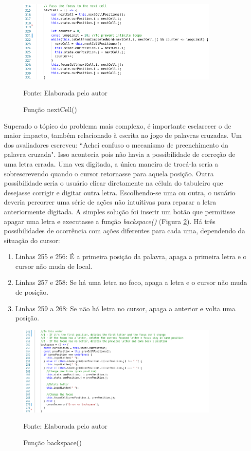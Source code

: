 \begin{figure}[H]
\centering
    \caption{Função nextCell()}
    \label{fig:nextcell}
    \includegraphics[width=0.9\textwidth]{Figuras/codeNextCell.png}
    
    Fonte: Elaborada pelo autor
\end{figure}



Superado o tópico do problema mais complexo, é importante esclarecer o de maior impacto, também relacionado à escrita no jogo de palavras cruzadas.
Um dos avaliadores escreveu: ``Achei confuso o mecanismo de preenchimento da palavra cruzada". Isso acontecia pois não havia a possibilidade de correção de uma letra errada. Uma vez digitada, a única maneira de trocá-la seria a sobrescrevendo quando o cursor retornasse para aquela posição. Outra possibilidade seria o usuário clicar diretamente na célula do tabuleiro que desejasse corrigir e digitar outra letra. Escolhendo-se uma ou outra, o usuário deveria percorrer uma série de ações não intuitivas para reparar a letra anteriormente digitada. A simples solução foi inserir um botão que permitisse apagar uma letra e executasse a função \textit{backspace()} (Figura \ref{fig:backspace}). Há três possibilidades de ocorrência com ações diferentes para cada uma, dependendo da situação do cursor:
\begin{enumerate}
    \item Linhas 255 e 256: É a primeira posição da palavra, apaga a primeira letra e o cursor não muda de local.
    \item Linhas 257 e 258: Se há uma letra no foco, apaga a letra e o cursor não muda de posição.
    \item Linhas 259 a 268: Se não há letra no cursor, apaga a anterior e volta uma posição.
\end{enumerate}

\begin{figure}[H]
\centering
    \caption{Função backspace()}
    \label{fig:backspace}
    \includegraphics[width=0.9\textwidth]{Figuras/codeBackspace.png}
    
    Fonte: Elaborada pelo autor
\end{figure}

